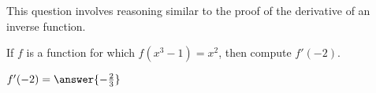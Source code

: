 \documentclass{ximera}
\author{Steven Gubkin}
\begin{document}
\begin{exercise}



This question involves reasoning similar to the proof of the derivative of an inverse function.

If $f$ is a function for which $f(x^3-1) = x^2$, then compute $f'(-2)$.
\begin{prompt}
$f'(-2) = \answer{-\frac{2}{3}}$
\end{prompt}
\end{exercise}
\end{document}
